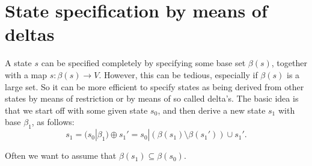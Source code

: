 \documentclass[10pt, fleqn]{report}
\begin{document}
\section{State specification by means of deltas}

A state $s$ can be specified completely by specifying some base set $\beta(s)$,
together with a map $s:\beta(s) \rightarrow V$.
However, this can be tedious, especially if $\beta(s)$ is a large set.
So it can be more efficient to specify states as being derived from other states by means
of restriction or by means of so called delta's.
The basic idea is that we start off with some given state $s_0$, and then derive a new state
$s_1$ with base $\beta_1$, as follows:
\[s_1 = (s_0|\beta_1)\oplus s_1' = s_0|(\beta(s_1)\setminus\beta(s_1')) \cup s_1'.\]

Often we want to assume that $\beta(s_1)\subseteq \beta(s_0)$.
\end{document}
